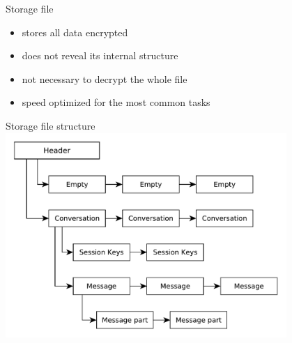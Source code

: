 \documentclass{beamer}
\begin{document}

%


\begin{frame}{Storage file}
	\begin{itemize}
		\item{stores all data encrypted}
		\item{does not reveal its internal structure}
		\item{not necessary to decrypt the whole file}
		\item{speed optimized for the most common tasks}
	\end{itemize}
\end{frame}

\begin{frame}{Storage file structure}
	\centering
	\includegraphics[width=0.8\textwidth]{storage_file}
\end{frame}
\end{document}
